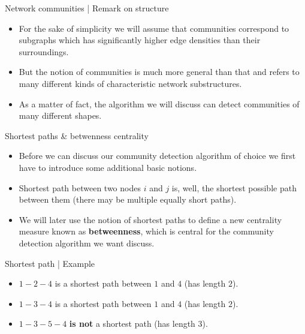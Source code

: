 \documentclass[
    hyperref={colorlinks,linkcolor=blue,urlcolor=blue,citecolor=blue}
]{beamer}
\begin{document}
\begin{frame}{Network communities | Remark on structure}
\begin{itemize}
    \item<1-> For the sake of simplicity we will assume that communities
    correspond to subgraphs which has significantly higher edge densities
    than their surroundings.
    \item<2-> But the notion of communities is much more general than that
    and refers to many different kinds of characteristic network substructures.
    \item<3-> As a matter of fact, the algorithm we will discuss can detect
    communities of many different shapes.
\end{itemize}
\end{frame}

\begin{frame}{Shortest paths \& betwenness centrality}
\begin{itemize}
    \item<1-> Before we can discuss our community detection algorithm of choice
    we first have to introduce some additional basic notions.
    \item<2-> Shortest path between two nodes $i$ and $j$ is, well,
    the shortest possible path between them (there may be multiple equally
    short paths).
    \item<3-> We will later use the notion of shortest paths to define a new
    centrality measure known as \textbf{betweenness}, which is central
    for the community detection algorithm we want discuss.
\end{itemize}
\end{frame}

\begin{frame}{Shortest path | Example}
\begin{center}
\end{center}
\begin{itemize}
    \item<2-> $1-2-4$ is a shortest path between $1$ and $4$ (has length $2$).
    \item<3-> $1-3-4$ is a shortest path between $1$ and $4$ (has length $2$).
    \item<4-> $1-3-5-4$ \textbf{is not} a shortest path (has length $3$).
\end{itemize}
\end{frame}
\end{document}
